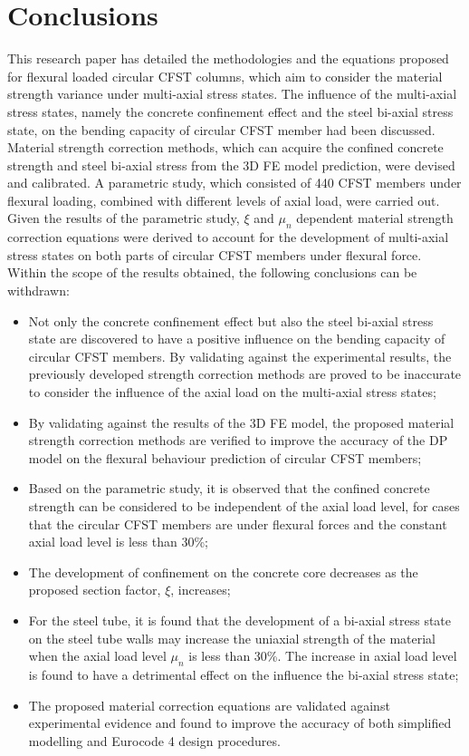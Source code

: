 \documentclass[12pt,a4]{article}
\begin{document}
	\section{Conclusions}
	This research paper has detailed the methodologies and the equations proposed for flexural loaded circular CFST columns, which aim to consider the material strength variance under multi-axial stress states. The influence of the multi-axial stress states, namely the concrete confinement effect and the steel bi-axial stress state, on the bending capacity of circular CFST member had been discussed. Material strength correction methods, which can acquire the confined concrete strength and steel bi-axial stress from the 3D FE model prediction, were devised and calibrated. A parametric study, which consisted of 440 CFST members under flexural loading, combined with different levels of axial load, were carried out. Given the results of the parametric study, $ξ$ and $μ_n$ dependent material strength correction equations were derived to account for the development of multi-axial stress states on both parts of circular CFST members under flexural force. Within the scope of the results obtained, the following conclusions can be withdrawn:
	\begin{itemize}
		\item Not only the concrete confinement effect but also the steel bi-axial stress state are discovered to have a positive influence on the bending capacity of circular CFST members. By validating against the experimental results, the previously developed strength correction methods are proved to be inaccurate to consider the influence of the axial load on the multi-axial stress states;
		
		\item By validating against the results of the 3D FE model, the proposed material strength correction methods are verified to improve the accuracy of the DP model on the flexural behaviour prediction of circular CFST members;
		
		\item Based on the parametric study, it is observed that the confined concrete strength can be considered to be independent of the axial load level, for cases that the circular CFST members are under flexural forces and the constant axial load level is less than 30\%;
		
		\item The development of confinement on the concrete core decreases as the proposed section factor, $ξ$, increases;
		
		\item For the steel tube, it is found that the development of a bi-axial stress state on the steel tube walls may increase the uniaxial strength of the material when the axial load level $μ_n$ is less than 30\%. The increase in axial load level is found to have a detrimental effect on the influence the bi-axial stress state;
		
		\item The proposed material correction equations are validated against experimental evidence and found to improve the accuracy of both simplified modelling and Eurocode 4 design procedures.
	\end{itemize}
	
	
	
	
	
	
	
\end{document}
